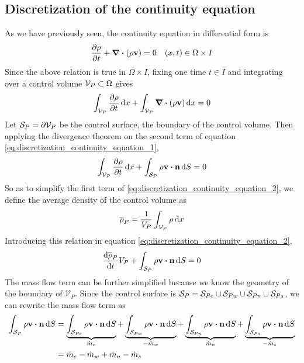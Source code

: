 
\subsection{Discretization of the continuity equation}

As we have previously seen, the continuity equation in differential form is
\begin{equation*}
	\pdv{\rho}{t} + \div(\rho \vb{v}) = 0 \quad (x,t) \in \Omega \times I
\end{equation*}
Since the above relation is true in $\Omega \times I$, fixing one time $t \in I$
and integrating over a control volume $\mathcal{V}_{P} \subset \Omega$ gives
\begin{equation} \label{eq:discretization_continuity_equation_1}
	\int_{\mathcal{V}_{P}} \pdv{\rho}{t} \dd{x} + \int_{\mathcal{V}_{P}} \div(\rho \vb{v}) \dd{x} = 0
\end{equation}
Let $\mathcal{S}_{P} = \partial \mathcal{V}_{P}$ be the control surface, \ie the boundary of the
control volume. Then applying the divergence theorem on the second term of
equation \eqref{eq:discretization_continuity_equation_1},
\begin{equation} \label{eq:discretization_continuity_equation_2}
	\int_{\cv{P}} \pdv{\rho}{t} \dd{x} + 
	\int_{\cs{P}} \rho \vb{v} \vdot \vb{n} \dd{S} = 0
\end{equation}
So as to simplify the first term of
\eqref{eq:discretization_continuity_equation_2}, we define the average density of the
control volume as
\begin{equation*}
	\overline{\rho}_P = \frac{1}{V_P} \int_{\mathcal{V}_{P}} \rho \dd{x}
\end{equation*}
Introducing this relation in equation
\eqref{eq:discretization_continuity_equation_2},
\begin{equation} \label{eq:discretization_continuity_equation_3}
	\frac{\dd \overline{\rho}_P}{\dd{t}} V_P + 
	\int_{\cs{P}} \rho \vb{v} \vdot \vb{n} \dd{S} = 0
\end{equation}
The mass flow term can be further simplified because we know the geometry of the
boundary of $\mathcal{V}_P$. Since the control surface is $\mathcal{S}_{P} = \mathcal{S}_{Pe} \cup
\mathcal{S}_{Pw} \cup \mathcal{S}_{Pn} \cup \mathcal{S}_{Ps}$, we can rewrite the mass flow term as
\begin{align}
	\int_{\cs{P}} \rho \vb{v} \vdot \vb{n} \dd{S} 
	&= 
	\underbrace{\int_{\cs{Pe}} \rho \vb{v} \vdot \vb{n} \dd{S}}_{\dot{m}_e}
	+ \underbrace{\int_{\cs{Pw}} \rho \vb{v} \vdot \vb{n} \dd{S}}_{-\dot{m}_w}
	+ \underbrace{\int_{\cs{Pn}} \rho \vb{v} \vdot \vb{n} \dd{S}}_{\dot{m}_n}
	+ \underbrace{\int_{\cs{Ps}} \rho \vb{v} \vdot \vb{n} \dd{S}}_{-\dot{m}_s} \nonumber \\
	&= \dot{m}_e - \dot{m}_w + \dot{m}_n - \dot{m}_s \label{eq:discretization_continuity_equation_7}
\end{align}
